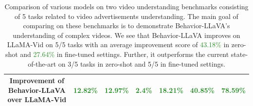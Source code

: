 \begin{landscape}
\begin{table}
\begin{adjustbox}{max width=1.5\textwidth}
\begin{tabular}{llllllll}
\cline{2-8}
\multicolumn{2}{c}{\textbf{Improvement of Behavior-LLaVA over LLaMA-Vid}} & \textcolor{ForestGreen}{12.82\%} & \textcolor{ForestGreen}{12.97\%} & \textcolor{ForestGreen}{2.4\%} &  \textcolor{ForestGreen}{18.21\%} & \textcolor{ForestGreen}{40.85\%}& \textcolor{ForestGreen}{78.59\%}\\
\bottomrule[1.2pt]
\end{tabular}
\end{adjustbox}
\caption{Comparison of various models on two video understanding benchmarks \cite{hussain2017automatic,singla2022persuasion} consisting of 5 tasks related to video advertisements understanding. The main goal of comparing on these benchmarks is to demonstrate Behavior-LLaVA's understanding of complex videos. We see that Behavior-LLaVA improves on LLaMA-Vid on 5/5 tasks with an average improvement score of \textcolor{ForestGreen}{43.18\%} in zero-shot and \textcolor{ForestGreen}{27.64\%} in fine-tuned settings. Further, it outperforms the current state-of-the-art on 3/5 tasks in zero-shot and 5/5 in fine-tuned settings. \label{tab:ad-understanding-kovashka-full-table}}
\end{table}


\end{landscape}
















